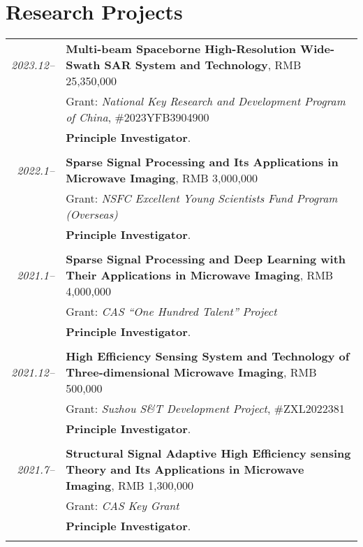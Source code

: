 \documentclass[paper=a4,fontsize=11pt]{scrartcl}
\begin{document}
\section*{Research Projects}

\begin{longtable}{r|p{12cm}}
	
	\emph{2023.12--} & \textbf{Multi-beam Spaceborne High-Resolution Wide-Swath SAR System and Technology}, RMB 25,350,000 \\
	& Grant: \emph{National Key Research and Development Program of China}, \#2023YFB3904900\\
	& \textbf{Principle Investigator}.\\
	\multicolumn{2}{c}{} \\
	
	\emph{2022.1--} & \textbf{Sparse Signal Processing and Its Applications in Microwave Imaging}, RMB 3,000,000 \\
	& Grant: \emph{NSFC Excellent Young Scientists Fund Program (Overseas)}\\
	& \textbf{Principle Investigator}.\\
	\multicolumn{2}{c}{} \\
	
	\emph{2021.1--} & \textbf{Sparse Signal Processing and Deep Learning with Their Applications in Microwave Imaging}, RMB 4,000,000 \\
	& Grant: \emph{CAS ``One Hundred Talent'' Project}\\
	& \textbf{Principle Investigator}.\\
	\multicolumn{2}{c}{} \\
	
	\emph{2021.12--} & \textbf{High Efficiency Sensing System and Technology of Three-dimensional Microwave Imaging}, RMB 500,000 \\
	& Grant: \emph{Suzhou S\&T Development Project}, \#ZXL2022381\\
	& \textbf{Principle Investigator}.\\
	\multicolumn{2}{c}{} \\
	
	\emph{2021.7--} & \textbf{Structural Signal Adaptive High Efficiency sensing Theory and Its Applications in Microwave Imaging}, RMB 1,300,000 \\
	& Grant: \emph{CAS Key Grant}\\
	& \textbf{Principle Investigator}.\\
	\multicolumn{2}{c}{} \\
	

\end{longtable}
\end{document}

